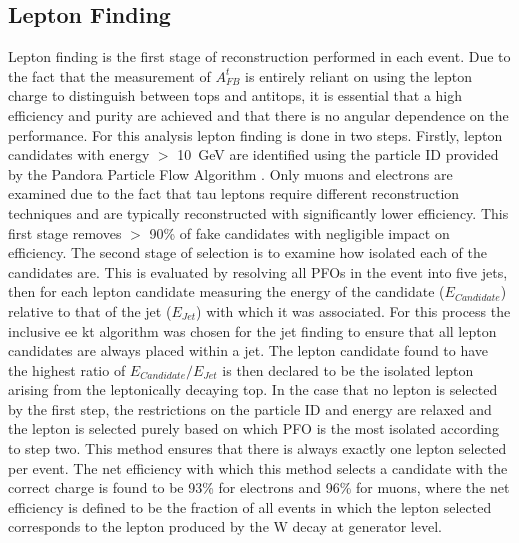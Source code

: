 \subsection{Lepton Finding}
\label{sec:lepfinding}
Lepton finding is the first stage of reconstruction performed in each event. Due to the fact that the measurement of $A_{FB}^{t}$ is entirely reliant on using the lepton charge to distinguish between tops and antitops, it is essential that a high efficiency and purity are achieved and that there is no angular dependence on the performance. For this analysis lepton finding is done in two steps. Firstly, lepton candidates with energy $>$ 10~GeV are identified using the particle ID provided by the Pandora Particle Flow Algorithm \cite{Thomson200925}. Only muons and electrons are examined due to the fact that tau leptons require different reconstruction techniques and are typically reconstructed with significantly lower efficiency. This first stage removes $>$ 90\% of fake candidates with negligible impact on efficiency. The second stage of selection is to examine how isolated each of the candidates are. This is evaluated by resolving all PFOs in the event into five jets, then for each lepton candidate measuring the energy of the candidate ($E_{Candidate}$) relative to that of the jet ($E_{Jet}$) with which it was associated. For this process the inclusive ee kt algorithm was chosen for the jet finding to ensure that all lepton candidates are always placed within a jet. The lepton candidate found to have the highest ratio of $E_{Candidate}/E_{Jet}$ is then declared to be the isolated lepton arising from the leptonically decaying top. In the case that no lepton is selected by the first step, the restrictions on the particle ID and energy are relaxed and the lepton is selected purely based on which PFO is the most isolated according to step two. This method ensures that there is always exactly one lepton selected per event. The net efficiency with which this method selects a candidate with the correct charge is found to be 93\% for electrons and 96\% for muons, where the net efficiency is defined to be the fraction of all events in which the lepton selected corresponds to the lepton produced by the W decay at generator level.

